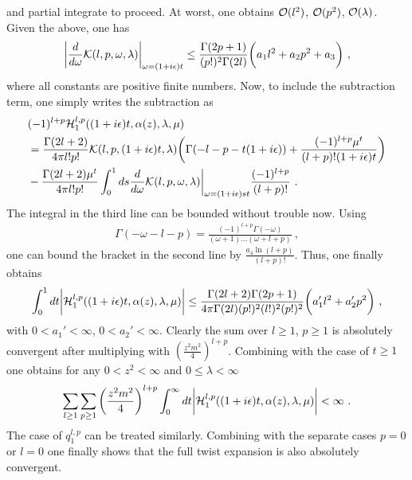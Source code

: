 \documentclass[a4paper,11pt]{article}
\begin{document}
and partial integrate to proceed. At worst, one obtains ${\cal O}(l^2)$, ${\cal O}(p^2)$, ${\cal O}(\lambda)$. Given the above, one has
\begin{align}
\bigg|\frac{d}{d\omega}{\cal K}(l,p,\omega,\lambda)\bigg|_{\omega=(1+i\epsilon)t} \le \frac{\Gamma(2p+1)}{(p!)^2\Gamma(2l)}\bigg(a_1l^2+a_2p^2+a_3\bigg) \ ,
\end{align}
where all constants are positive finite numbers. Now, to include the subtraction term, one simply writes the subtraction as 
\begin{align}
&(-1)^{l+p}{\cal H}_1^{l,p}((1+i\epsilon)t,\alpha(z),\lambda,\mu)\nonumber \\ 
&=\frac{\Gamma(2l+2)}{4\pi l!p!}{\cal K}(l,p,(1+i\epsilon)t,\lambda)\bigg(\Gamma(-l-p-t(1+i\epsilon))+\frac{(-1)^{l+p}\mu^t}{(l+p)!(1+i\epsilon)t}\bigg) \nonumber \\ 
&- \frac{\Gamma(2l+2)\mu^t}{4\pi l!p!}\int_{0}^1 ds \frac{d}{d\omega}{\cal K}(l,p,\omega,\lambda)\bigg|_{\omega=(1+i\epsilon)st}\frac{(-1)^{l+p}}{(l+p)!} \ .
\end{align}
The integral in the third line can be bounded without trouble now. Using 
\begin{align}
\Gamma(-\omega-l-p)=\frac{(-1)^{l+p}\Gamma(-\omega)}{(\omega+1)...(\omega+l+p)} \ ,
\end{align}
one can bound the  bracket in the second line by $\frac{a_4\ln (l+p)}{(l+p)!}$. Thus, one finally obtains 
\begin{align}
\int_{0}^1 dt \bigg|{\cal H}_1^{l,p}((1+i\epsilon)t,\alpha(z),\lambda,\mu)\bigg|\le \frac{\Gamma(2l+2)\Gamma(2p+1)}{4\pi \Gamma(2l) (p!)^2(l!)^2(p!)^2}\bigg(a_1'l^2+a_2'p^2\bigg) \ ,
\end{align}
with $0<a_1'<\infty$, $0<a_2'<\infty$. Clearly the sum over $l\ge 1$, $p\ge 1$ is absolutely convergent after multiplying with $\left(\frac{z^2m^2}{4}\right)^{l+p}$. Combining with the case of $t\ge 1$ one obtains for any $0<z^2<\infty$ and $0\le \lambda<\infty$
\begin{align}
\sum_{l\ge 1 }\sum_{p\ge 1}\left(\frac{z^2m^2}{4}\right)^{l+p}\int_{0}^\infty dt \bigg|{\cal H}_1^{l,p}((1+i\epsilon)t,\alpha(z),\lambda,\mu)\bigg|<\infty \ .
\end{align}
The case of $q_1^{l,p}$ can be treated similarly. Combining with the separate cases $p=0$ or $l=0$ one finally shows that the full twist expansion is also absolutely convergent.   
\end{document}
